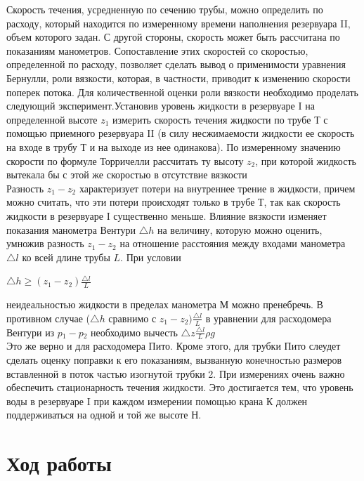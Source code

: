 \documentclass[a4paper,12pt]{article} %
\begin{document}
Скорость течения, усредненную по сечению трубы, можно определить по расходу, который находится по измеренному времени наполнения резервуара II, объем которого задан. С другой стороны, скорость
может быть рассчитана по показаниям манометров. Сопоставление этих скоростей со скоростью, определенной по расходу, позволяет сделать вывод о применимости уравнения Бернулли, роли вязкости, которая, в частности, приводит к изменению скорости поперек потока.
 Для количественной оценки роли вязкости необходимо проделать следующий эксперимент.Установив уровень жидкости в резервуаре I на определенной высоте $z{}_1{}$ измерить скорость течения жидкости по трубе Т с помощью приемного резервуара II (в силу несжимаемости жидкости ее скорость на входе в трубу Т и на выходе из нее одинакова). По измеренному значению
скорости по формуле Торричелли рассчитать ту высоту $z{}_2{}$, при которой жидкость вытекала бы с этой же скоростью в отсутствие вязкости\\
Разность $z{}_1{} - z{}_2{}$ характеризует потери на внутреннее трение в жидкости, причем можно считать, что эти потери происходят только в трубе Т, так как скорость жидкости в резервуаре I существенно меньше.
Влияние вязкости изменяет показания манометра Вентури $\triangle h$ на
величину, которую можно оценить, умножив разность $z{}_1{} - z{}_2{}$ на отношение расстояния между входами манометра $\triangle l$ ко всей длине трубы $L$. При условии
\begin{center}
$\triangle h \geq(z{}_1{} - z{}_2{})\frac {\triangle l}{L}$
\end{center}
неидеальностью жидкости в пределах манометра М можно пренебречь.
В противном случае ($\triangle h$ сравнимо с $z{}_1{} - z{}_2{})\frac {\triangle l}{L}$
 в уравнении для расходомера Вентури из
$p{}_1{} - p{}_2{}$ необходимо вычесть $\triangle z\frac {\triangle l}{L}\rho g$\\
Это же верно и для расходомера Пито. Кроме этого, для трубки Пито слеудет сделать оценку поправки к его показаниям, вызванную конечностью размеров вставленной в поток частью изогнутой трубки 2.
При измерениях очень важно обеспечить стационарность течения жидкости. Это достигается тем, что уровень воды в резервуаре I при каждом измерении  помощью крана К должен поддерживаться на одной и той же высоте Н.

\section{Ход работы}
\end{document}
